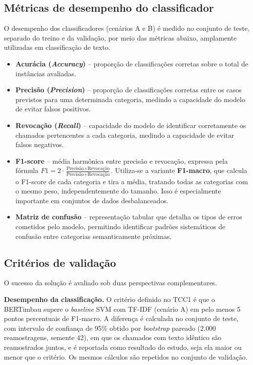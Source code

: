 \documentclass[
    12pt,                %
    openright,           %
    oneside,             %
    a4paper,             %
    english,             %
    brazil               %
]{abntex2}
\begin{document}
\subsection{Métricas de desempenho do classificador}
\label{sec:metricas_avaliacao}

O desempenho dos classificadores (cenários A e B) é medido no conjunto de teste, separado do treino e da validação, por meio das métricas abaixo, amplamente utilizadas em classificação de texto.

\begin{itemize}
\item \textbf{Acurácia (\textit{Accuracy})} -- proporção de classificações corretas sobre o total de instâncias avaliadas.

\item \textbf{Precisão (\textit{Precision})} -- proporção de classificações corretas entre os casos previstos para uma determinada categoria, medindo a capacidade do modelo de evitar falsos positivos.

\item \textbf{Revocação (\textit{Recall})} -- capacidade do modelo de identificar corretamente os chamados pertencentes a cada categoria, medindo a capacidade de evitar falsos negativos.

\item \textbf{F1-score} -- média harmônica entre precisão e revocação, expressa pela fórmula $F1 = 2 \cdot \frac{\text{Precisão} \times \text{Revocação}}{\text{Precisão} + \text{Revocação}}$. Utiliza-se a variante \textbf{F1-macro}, que calcula o F1-score de cada categoria e tira a média, tratando todas as categorias com o mesmo peso, independentemente do tamanho. Isso é especialmente importante em conjuntos de dados desbalanceados.

\item \textbf{Matriz de confusão} -- representação tabular que detalha os tipos de erros cometidos pelo modelo, permitindo identificar padrões sistemáticos de confusão entre categorias semanticamente próximas.
\end{itemize}

\subsection{Critérios de validação}
\label{subsec:criterios_validacao}

O sucesso da solução é avaliado sob duas perspectivas complementares.

\textbf{Desempenho da classificação.} O critério definido no TCC1 é que o BERTimbau supere o \textit{baseline} SVM com TF-IDF (cenário A) em pelo menos 5 pontos percentuais de F1-macro. A diferença é calculada no conjunto de teste, com intervalo de confiança de 95\% obtido por \textit{bootstrap} pareado (2.000 reamostragens, semente 42), em que os chamados com texto idêntico são reamostrados juntos, e é reportada como resultado do estudo, seja ela maior ou menor que o critério. Os mesmos cálculos são repetidos no conjunto de validação.
\end{document}

